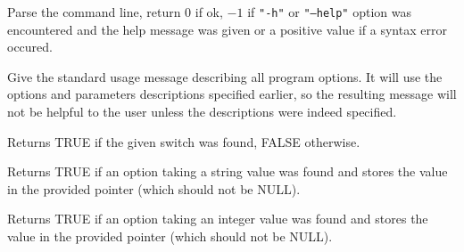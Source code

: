 \label{wxcmdlineparserparse}


Parse the command line, return $0$ if ok, $-1$ if {\tt "-h"} or {\tt "--help"} 
option was encountered and the help message was given or a positive value if a
syntax error occured.



\label{wxcmdlineparserusage}


Give the standard usage message describing all program options. It will use the
options and parameters descriptions specified earlier, so the resulting message
will not be helpful to the user unless the descriptions were indeed specified.



\label{wxcmdlineparserfoundswitch}


Returns TRUE if the given switch was found, FALSE otherwise.

\label{wxcmdlineparserfoundstringoption}


Returns TRUE if an option taking a string value was found and stores the
value in the provided pointer (which should not be NULL).

\label{wxcmdlineparserfoundintoption}


Returns TRUE if an option taking an integer value was found and stores
the value in the provided pointer (which should not be NULL).

